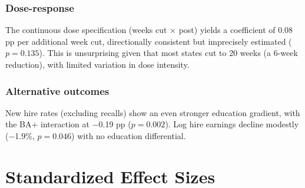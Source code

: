 \documentclass[12pt]{article}
\begin{document}
\subsubsection*{Dose-response} The continuous dose specification (weeks cut $\times$ post) yields a coefficient of 0.08 pp per additional week cut, directionally consistent but imprecisely estimated ($p = 0.135$). This is unsurprising given that most states cut to 20 weeks (a 6-week reduction), with limited variation in dose intensity.

\subsubsection*{Alternative outcomes} New hire rates (excluding recalls) show an even stronger education gradient, with the BA+ interaction at $-$0.19 pp ($p = 0.002$). Log hire earnings decline modestly ($-$1.9\%, $p = 0.046$) with no education differential.

\section{Standardized Effect Sizes}
\label{sec:sde}


\end{document}
